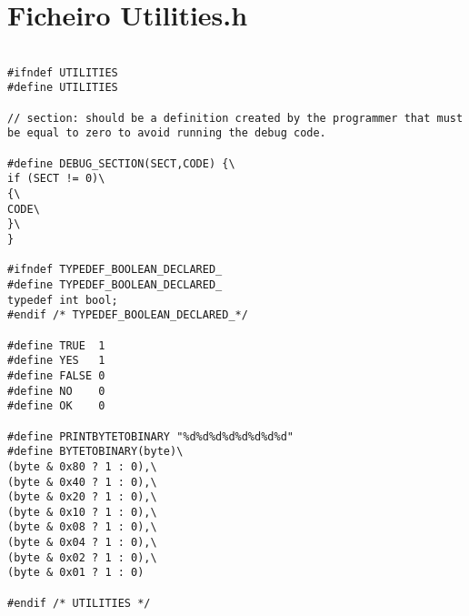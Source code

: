 \section{Ficheiro Utilities.h}
\label{UTILITIESH}

\begin{lstlisting}

#ifndef UTILITIES
#define UTILITIES

// section: should be a definition created by the programmer that must be equal to zero to avoid running the debug code.

#define DEBUG_SECTION(SECT,CODE) {\
if (SECT != 0)\
{\
CODE\
}\
}

#ifndef TYPEDEF_BOOLEAN_DECLARED_
#define TYPEDEF_BOOLEAN_DECLARED_
typedef int bool; 
#endif /* TYPEDEF_BOOLEAN_DECLARED_*/

#define TRUE  1
#define YES   1
#define FALSE 0
#define NO    0
#define OK    0

#define PRINTBYTETOBINARY "%d%d%d%d%d%d%d%d"
#define BYTETOBINARY(byte)\
(byte & 0x80 ? 1 : 0),\
(byte & 0x40 ? 1 : 0),\
(byte & 0x20 ? 1 : 0),\
(byte & 0x10 ? 1 : 0),\
(byte & 0x08 ? 1 : 0),\
(byte & 0x04 ? 1 : 0),\
(byte & 0x02 ? 1 : 0),\
(byte & 0x01 ? 1 : 0)

#endif /* UTILITIES */

\end{lstlisting}